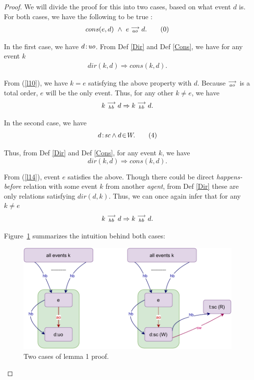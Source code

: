 \begin{proof}
    
    We will divide the proof for this into two cases, based on what event $d$ is. For both cases, we have the following to be true :
    \begin{align*}
        cons(e,d) \ \wedge \ e\stackrel{\longrightarrow}{_{ao}}d.
        \tag{0}
        \label{l10}
    \end{align*}
        
    In the first case, we have $d\!:\!\textit{uo}$. From Def \ref{Dir} and Def \ref{Cons}, we have for any event $k$
    \begin{align*}
        dir(k,d) \Rightarrow cons(k,d).
    \end{align*}
        
    From (\ref{l10}), we have $k=e$ satisfying the above property with $d$. 
    Because $\stackrel{\longrightarrow}{_{ao}}$ is a total order, $e$ will be the only event. Thus, for any other $k \neq e$, we have     
    \begin{align*}
        k\stackrel{\longrightarrow}{_{hb}}d \Rightarrow k\stackrel{\longrightarrow}{_{hb}}d.
    \end{align*}
    
    In the second case, we have 
    \[
        d\!:\!\textit{sc} \wedge d\!\in\!W.
        \tag{4}
        \label{l14}
    \]
    
    Thus, from Def \ref{Dir} and Def \ref{Cons}, for any event $k$, we have 
    \[
        dir(k,d) \Rightarrow cons(k,d).
    \]
    
    From (\ref{l14}), event $e$ satisfies the above.
    Though there could be direct \textit{happens-before} relation with some event $k$ from another \textit{agent}, from Def \ref{Dir} these are only relations satisfying $dir(d,k)$. Thus, we can once again infer that for any $k \neq e$ 
    \[
        k\stackrel{\longrightarrow}{_{hb}}d \Rightarrow k\stackrel{\longrightarrow}{_{hb}}d.
    \]
    
    Figure~\ref{lemma:first} summarizes the intuition behind both cases: 
    \begin{figure}[H]
        \centering
        \includegraphics[scale=0.7]{5.InstructionReordering/3.Lemmas/Lemma1.pdf}
        \caption{Two cases of lemma 1 proof.}
        \label{lemma:first}
    \end{figure}
    
\end{proof}

